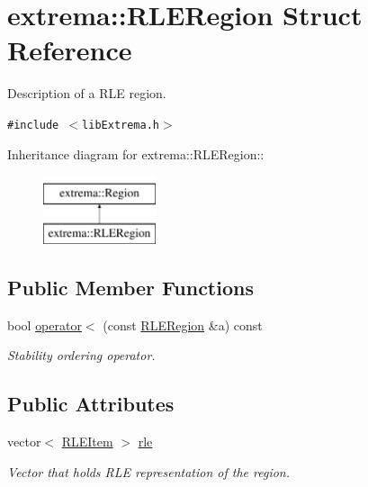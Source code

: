 \hypertarget{structextrema_1_1RLERegion}{
\section{extrema::RLERegion Struct Reference}
\label{structextrema_1_1RLERegion}
}
Description of a RLE region.  


{\tt \#include $<$lib\-Extrema.h$>$}

Inheritance diagram for extrema::RLERegion::\begin{figure}[H]
\begin{center}
\leavevmode
\includegraphics[height=2cm]{structextrema_1_1RLERegion}
\end{center}
\end{figure}
\subsection*{Public Member Functions}
\begin{CompactItemize}
\item 
bool \hyperlink{structextrema_1_1RLERegion_e84a02a4b45914740b25ceb7924f9282}{operator$<$} (const \hyperlink{structextrema_1_1RLERegion}{RLERegion} \&a) const 
\begin{CompactList}\small\item\em Stability ordering operator. \item\end{CompactList}\end{CompactItemize}
\subsection*{Public Attributes}
\begin{CompactItemize}
\item 
vector$<$ \hyperlink{structextrema_1_1RLEItem}{RLEItem} $>$ \hyperlink{structextrema_1_1RLERegion_34dbc363e564a8678830ae416e480a42}{rle}
\begin{CompactList}\small\item\em Vector that holds RLE representation of the region. \item\end{CompactList}\end{CompactItemize}


